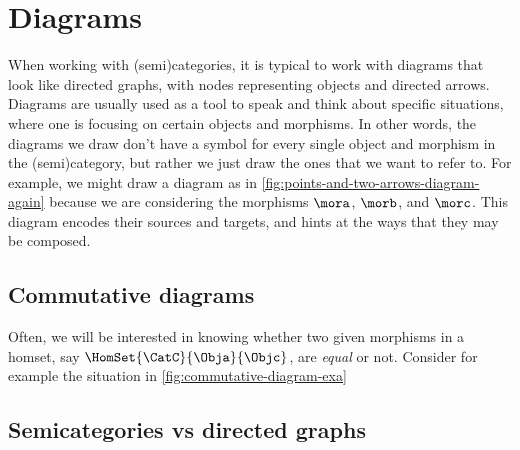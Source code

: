 
\section{Diagrams}


When working with (semi)categories, it is typical to work with diagrams that look like directed graphs, with nodes representing objects and directed arrows.
Diagrams are usually used as a tool to speak and think about specific situations, where one is focusing on certain objects and morphisms.
In other words, the diagrams we draw don't have a symbol for every single object and morphism in the (semi)category, but rather we just draw the ones that we want to refer to.
For example, we might draw a diagram as in \cref{fig:points-and-two-arrows-diagram-again} because we are considering the morphisms $\mora$, $\morb$, and $\morc$.
This diagram encodes their sources and targets, and hints at the ways that they may be composed.

\begin{marginfigure}
    \begin{center}
    \end{center}
    \caption{}
    \label{fig:points-and-three-arrows-diagram}
\end{marginfigure}

\subsection{Commutative diagrams}

Often, we will be interested in knowing whether two given morphisms in a homset, say $\HomSet{\CatC}{\Obja}{\Objc}$, are \emph{equal} or not.
Consider for example the situation in \cref{fig:commutative-diagram-exa}

\begin{marginfigure}
    \centering
    \caption{}
    \label{fig:commutative-diagram-exa}
\end{marginfigure}


\subsection{Semicategories vs directed graphs}

